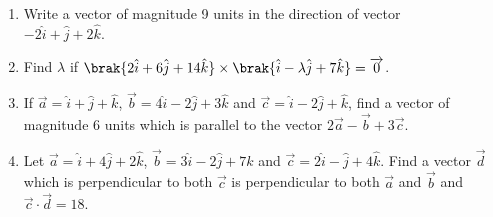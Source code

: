 \begin{enumerate}

\item Write a vector of magnitude 9 units in the direction of vector \\ $-2\hat{i} + \hat{j} + 2\hat{k}$.

\item Find $\lambda$ if $\brak{2\hat{i} + 6\hat{j} + 14\hat{k}} \times \brak{\hat{i} - \lambda\hat{j} + 7\hat{k}} = \overrightarrow{0}$.

\item If $\overrightarrow{a} = \hat{i} + \hat{j} + \hat{k}$, $\overrightarrow{b} = 4\hat{i} - 2\hat{j} + 3\hat{k}$ and $\overrightarrow{c} = \hat{i} - 2\hat{j} + \hat{k}$, find a vector of magnitude 6 units which is parallel to the vector $2\overrightarrow{a} - \overrightarrow{b} + 3\overrightarrow{c}$.

\item Let $\overrightarrow{a} = \hat{i} + 4\hat{j} + 2\hat{k}$, $\overrightarrow{b} = 3\hat{i} - 2\hat{j} + 7\hat{k}$ and $\overrightarrow{c} = 2\hat{i} - \hat{j} + 4\hat{k}$. Find a vector $\overrightarrow{d}$ which is perpendicular to both $\overrightarrow{c}$ is perpendicular to both $\overrightarrow{a}$ and $\overrightarrow{b}$ and $\overrightarrow{c} \cdot \overrightarrow{d} = 18$.

\end{enumerate}